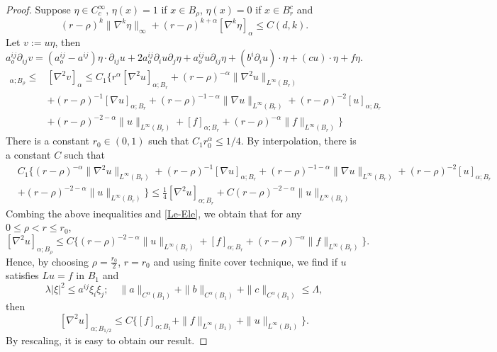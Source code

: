 \documentclass[twoside, 12pt]{book}
\numberwithin{equation}{chapter}
\def\leq{\leqslant}
\def\p{\partial}
\begin{document}
	\begin{proof}
		Suppose $\eta\in C_c^\infty$, $\eta(x)=1$ if $x\in B_{\rho}$, $\eta(x)=0$ if $x\in B^c_{r}$ and 
		$$(r-\rho)^{k}\|\nabla^k \eta \|_\infty+(r-\rho)^{k+\alpha}[\nabla^k \eta]_{\alpha}  \leq C(d, k). $$ 
		Let $v:=u\eta$, then 
		$$
		a^{ij}_o \p_{ij} v= (a^{ij}_o-a^{ij})\eta\cdot \p_{ij} u+2a^{ij}_o \p_i u\p_j \eta+ a^{ij}_o u\p_{ij}\eta+(b^i \p_i u )\cdot\eta+ (cu)\cdot \eta+ f\eta. 
		$$
		\begin{align*}
			[\nabla^2 u]_{\alpha; B_{\rho}}\leq& [\nabla^2 v]_\alpha\leq  C_1\Big\{  r^\alpha[\nabla^2 u]_{\alpha; B_{r}}+(r-\rho)^{-\alpha} \|\nabla^2 u\|_{L^\infty(B_{r})}\\
			&+ (r-\rho)^{-1} [\nabla u]_{\alpha; B_{r}}+(r-\rho)^{-1-\alpha} \|\nabla u\|_{L^\infty(B_{r})}+ (r-\rho)^{-2} [u]_{\alpha; B_{r}}\\
			&+(r-\rho)^{-2-\alpha} \|u\|_{L^\infty(B_{r})}+[f]_{\alpha; B_{r}}+(r-\rho)^{-\alpha}\|f\|_{L^\infty(B_{r})}\Big\}
		\end{align*}
		There is a constant $r_0\in (0,1)$ such that $C_1 r_0^\alpha\leq 1/4$. By interpolation, there is a constant $C$ such that 
		\begin{align*}
			&C_1\Big\{ (r-\rho)^{-\alpha} \|\nabla^2 u\|_{L^\infty(B_{r})}+ (r-\rho)^{-1} [\nabla u]_{\alpha; B_{r}}+(r-\rho)^{-1-\alpha} \|\nabla u\|_{L^\infty(B_{r})}+ (r-\rho)^{-2} [u]_{\alpha; B_{r}}\\
			&+(r-\rho)^{-2-\alpha} \|u\|_{L^\infty(B_{r})}\Big\}
			\leq \frac{1}{4} [\nabla^2 u]_{\alpha; B_{r}} +C (r-\rho)^{-2-\alpha} \|u\|_{L^\infty(B_r)}
		\end{align*}
		Combing the above inequalities and \ref{Le-Ele}, we obtain that for any $0\leq \rho<r\leq r_0$, 
		$$
		[\nabla^2 u]_{\alpha; B_\rho}\leq C \Big\{(r-\rho)^{-2-\alpha} \|u\|_{L^\infty(B_r)}+ [f]_{\alpha; B_{r}}+(r-\rho)^{-\alpha}\|f\|_{L^\infty(B_{r})}\Big\}.
		$$
		Hence, by choosing $\rho=\tfrac{r_0}{2}$, $r=r_0$ and using finite cover technique, we find if $u$ satisfies $Lu=f$ in $B_1$ and 
		$$\lambda |\xi|^2\leq a^{ij}\xi_i\xi_j; \quad \|a\|_{C^\alpha(B_1)}+\|b\|_{C^\alpha(B_1)}+\|c\|_{C^\alpha(B_1)}\leq \Lambda, $$
		then 
		$$
		[\nabla^2 u]_{\alpha; B_{1/2}}\leq C \Big\{ [f]_{\alpha;B_1} + \|f\|_{L^\infty(B_1)}+ \|u\|_{L^\infty(B_1)} \Big\}. 
		$$
		By rescaling, it is easy to obtain our result. 
	\end{proof}
	
	
	
	
	
    
	

	 
	
 
	\printindex
	
\end{document}

